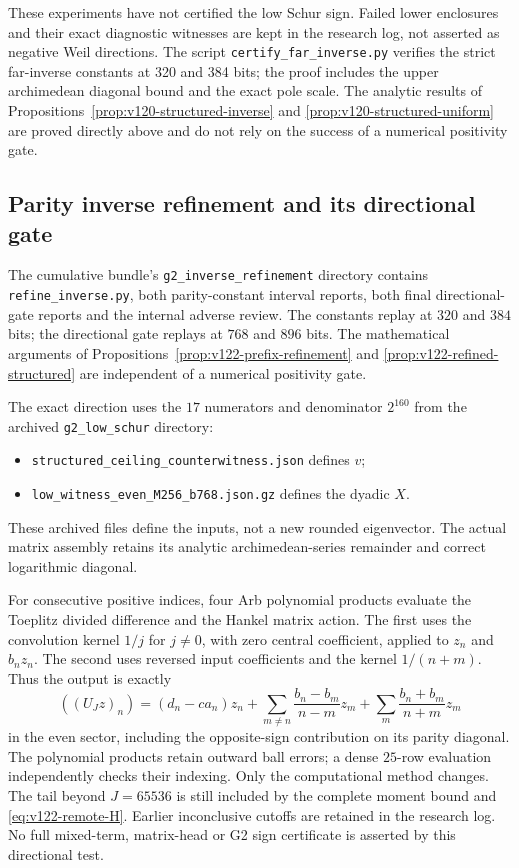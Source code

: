 \documentclass[11pt]{article}
\theoremstyle{remark}
\begin{document}
These experiments have not certified the low Schur sign. Failed
lower enclosures and their exact diagnostic witnesses are kept in the
research log, not asserted as negative Weil directions. The script \texttt{certify\_far\_inverse.py} verifies the
strict far-inverse constants at 320 and 384 bits; the proof includes
the upper archimedean diagonal bound and the exact pole scale.
The analytic
results of Propositions~\ref{prop:v120-structured-inverse} and
\ref{prop:v120-structured-uniform} are proved directly above and
do not rely on the success of a numerical positivity gate.

\subsection*{Parity inverse refinement and its directional gate}
\label{app:v122-inverse}
The cumulative bundle's \texttt{g2\_inverse\_refinement} directory
contains \texttt{refine\_inverse.py}, both parity-constant interval
reports, both final directional-gate reports and the internal adverse
review. The constants replay at $320$ and $384$ bits; the directional
gate replays at $768$ and $896$ bits. The mathematical arguments of
Propositions~\ref{prop:v122-prefix-refinement} and
\ref{prop:v122-refined-structured} are independent of a numerical
positivity gate.

The exact direction uses the $17$ numerators and denominator $2^{160}$
from the archived \texttt{g2\_low\_schur} directory:
\begin{itemize}[nosep]
\item \nolinkurl{structured_ceiling_counterwitness.json} defines $v$;
\item \nolinkurl{low_witness_even_M256_b768.json.gz} defines the dyadic $X$.
\end{itemize}
These archived files define the inputs, not a new rounded eigenvector.
The actual matrix assembly retains its analytic archimedean-series
remainder and correct logarithmic diagonal.

For consecutive positive indices, four Arb polynomial products
evaluate the Toeplitz divided difference and the Hankel matrix action.
The first uses the convolution kernel $1/j$ for $j\ne0$, with zero
central coefficient, applied to $z_n$ and $b_nz_n$. The second
uses reversed input coefficients and the kernel $1/(n+m)$.
Thus the output is exactly
\[
 ((U_Jz)_n)=(d_n-ca_n)z_n+
 \sum_{m\ne n}\frac{b_n-b_m}{n-m}z_m+
 \sum_m\frac{b_n+b_m}{n+m}z_m
\]
in the even sector, including the opposite-sign contribution on its
parity diagonal. The polynomial products retain outward ball errors;
a dense $25$-row evaluation independently checks their indexing.
Only the computational method changes. The tail beyond $J=65536$
is still included by the complete moment bound and
\eqref{eq:v122-remote-H}. Earlier inconclusive cutoffs are retained
in the research log. No full mixed-term, matrix-head or G2 sign
certificate is asserted by this directional test.
\end{document}
